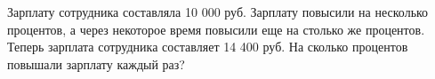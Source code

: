 \begin{ex}
	Зарплату сотрудника составляла 10 000 руб. Зарплату повысили на несколько процентов, а через некоторое время повысили еще на столько же процентов. Теперь зарплата сотрудника составляет 14 400 руб. На сколько процентов повышали зарплату каждый раз?
\end{ex}
